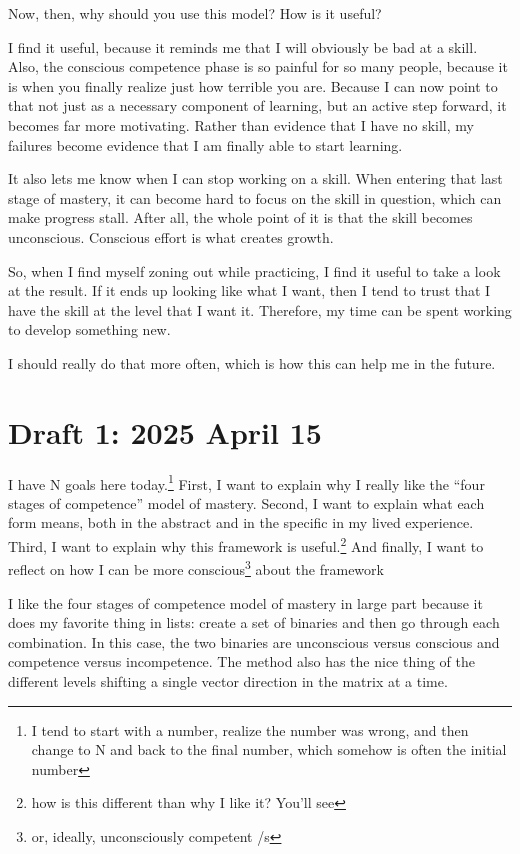 \documentclass[12pt]{article}
\newcommand{\say}[1]{``#1''}
\renewcommand{\,}{\textsuperscript{,}}
\begin{document}
Now, then, why should you use this model?  
How is it useful?

I find it useful, because it reminds me that I will obviously be bad at a skill.  
Also, the conscious competence phase is so painful for so many people, because it is when you finally realize just how terrible you are.  
Because I can now point to that not just as a necessary component of learning, but an active step forward, it becomes far more motivating.  
Rather than evidence that I have no skill, my failures become evidence that I am finally able to start learning.

It also lets me know when I can stop working on a skill.  
When entering that last stage of mastery, it can become hard to focus on the skill in question, which can make progress stall.  
After all, the whole point of it is that the skill becomes unconscious.  
Conscious effort is what creates growth.

So, when I find myself zoning out while practicing, I find it useful to take a look at the result.  
If it ends up looking like what I want, then I tend to trust that I have the skill at the level that I want it.  
Therefore, my time can be spent working to develop something new.

I should really do that more often, which is how this can help me in the future.

\section{Draft 1: 2025 April 15}

I have N goals here today.\footnote{I tend to start with a number, realize the number was wrong, and then change to N and back to the final number, which somehow is often the initial number}  
First, I want to explain why I really like the \say{four stages of competence} model of mastery.  
Second, I want to explain what each form means, both in the abstract and in the specific in my lived experience.  
Third, I want to explain why this framework is useful.\footnote{how is this different than why I like it? You'll see}  
And finally, I want to reflect on how I can be more conscious\footnote{or, ideally, unconsciously competent /s} about the framework

I like the four stages of competence model of mastery in large part because it does my favorite thing in lists: create a set of binaries and then go through each combination.  
In this case, the two binaries are unconscious versus conscious and competence versus incompetence.  
The method also has the nice thing of the different levels shifting a single vector direction in the matrix at a time.
\end{document}
